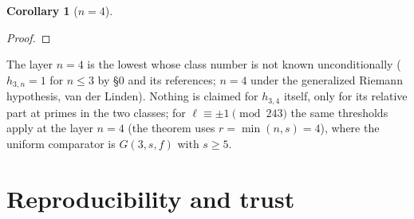 \documentclass[11pt]{amsart}
\newtheorem{corollary}[theorem]{Corollary}
\theoremstyle{remark}\newtheorem{remark}[theorem]{Remark}
\theoremstyle{definition}\newtheorem{definition}[theorem]{Definition}
\theoremstyle{definition}\newtheorem{algorithm}[theorem]{Algorithm}
\providecommand{\proofsdir}{../../proofs} %
\begin{document}
\begin{corollary}[$n=4$]\label{cor:P3n4}

\end{corollary}
\begin{proof}

\end{proof}
The layer $n=4$ is the lowest whose class number is not known unconditionally ($h_{3,n}=1$ for $n\le3$ by \cite{MO13} \S0 and its references; $n=4$ under the generalized Riemann hypothesis, van der Linden). Nothing is claimed for $h_{3,4}$ itself, only for its relative part at primes in the two classes; for $\ell\equiv\pm1\pmod{243}$ the same thresholds apply at the layer $n=4$ (the theorem uses $r=\min(n,s)=4$), where the uniform comparator is $G(3,s,f)$ with $s\ge5$.

\section{Reproducibility and trust}\label{sec:repro}
\end{document}

